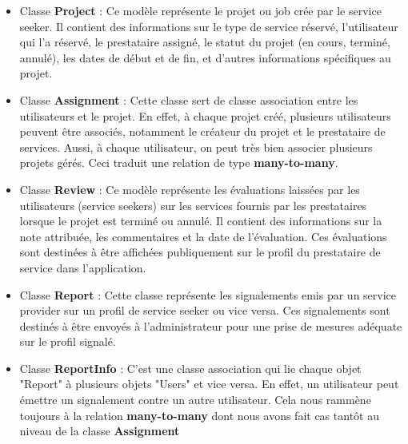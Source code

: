 {\vspace{0.35cm}

\begin{itemize}

    \item Classe \textbf{Project} :  Ce modèle représente le projet ou job crée par le service seeker. Il contient des informations sur le type de service réservé, l'utilisateur qui l'a réservé, le prestataire assigné, le statut du projet (en cours, terminé, annulé), les dates de début et de fin, et d'autres informations spécifiques au projet.

    \item Classe \textbf{Assignment} : Cette classe sert de classe association entre les utilisateurs et le projet. En effet, à chaque projet créé, plusieurs utilisateurs peuvent être associés, notamment le créateur du projet et le prestataire de services. Aussi, à chaque utilisateur, on peut très bien associer plusieurs projets gérés. Ceci traduit une relation de type \textbf{many-to-many}. 

    \item Classe \textbf{Review} :  Ce modèle représente les évaluations laissées par les utilisateurs (service seekers) sur les services fournis par les prestataires lorsque le projet est terminé ou annulé. Il contient des informations sur la note attribuée, les commentaires et la date de l'évaluation. Ces évaluations sont destinées à être affichées publiquement sur le profil du prestataire de service dans l'application.

    \item Classe \textbf{Report} : Cette classe représente les signalements emis par un service provider sur un profil de service seeker ou vice versa. Ces signalements sont destinés à être envoyés à l'administrateur pour une prise de mesures adéquate sur le profil signalé. 

    \item Classe \textbf{ReportInfo} : C'est une classe association qui lie chaque objet "Report" à plusieurs objets "Users" et vice versa. En effet, un utilisateur peut émettre un signalement contre un autre utilisateur. Cela nous rammène toujours à la relation \textbf{many-to-many} dont nous avons fait cas tantôt au niveau de la classe \textbf{Assignment}
\end{itemize}

\vspace{0.35cm}

}
